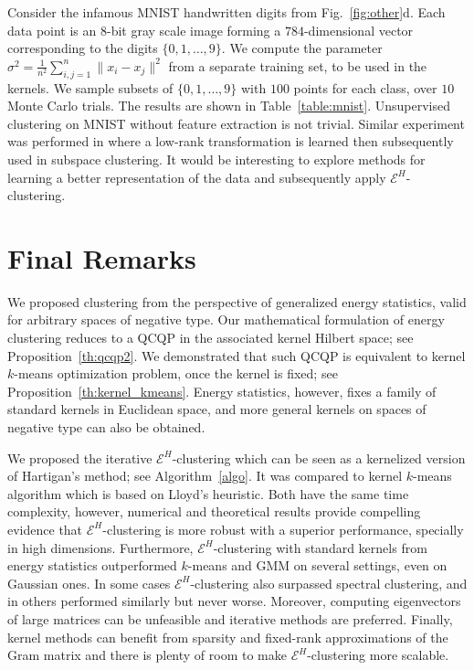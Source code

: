 \documentclass[twoside]{article}
\begin{document}
Consider 
the infamous MNIST handwritten digits
from Fig.~\ref{fig:other}d.
Each data point is an $8$-bit gray scale
image forming a $784$-dimensional vector 
corresponding to the digits $\{0,1,\dotsc,9 \}$.
We compute the parameter 
$
\sigma^2 = \tfrac{1}{n^2} \sum_{i,j=1}^n \| x_i - x_j \|^2 
$
from a separate
training set, to be used in the kernels.
We sample subsets of $\{0,1,\dotsc,9 \}$ with $100$ points 
for each class, over $10$ Monte Carlo trials.
The results are shown in Table~\ref{table:mnist}.
Unsupervised clustering on MNIST without feature extraction
is not trivial. Similar 
experiment was performed in \citep{Sapiro} where a low-rank
transformation is learned then subsequently used in subspace clustering. 
It would be interesting to explore methods
for learning a better representation of the data and subsequently apply
$\mathcal{E}^H$-clustering.


\section{Final Remarks}
\label{sec:conclusion}

We proposed clustering from the perspective of generalized energy
statistics, valid for arbitrary spaces of negative type.
Our mathematical formulation of energy clustering 
reduces to a QCQP in the associated kernel Hilbert space; 
see  Proposition~\ref{th:qcqp2}.
We demonstrated that such QCQP
is equivalent to kernel $k$-means optimization problem, 
once the kernel is fixed; see
Proposition~\ref{th:kernel_kmeans}. Energy statistics, however, fixes
a family of standard kernels in Euclidean space, and
more general kernels 
on spaces of negative type can also be obtained.

We proposed the iterative $\mathcal{E}^H$-clustering which can be seen
as a kernelized version of Hartigan's method; see Algorithm~\ref{algo}. 
It was compared to kernel $k$-means algorithm
which is based on Lloyd's heuristic.
Both have the same time complexity, however, numerical and theoretical
results provide compelling evidence that $\mathcal{E}^H$-clustering
is more robust with a superior performance, specially in high
dimensions. 
Furthermore, $\mathcal{E}^H$-clustering with standard kernels from energy
statistics outperformed $k$-means and GMM
on several settings, even on Gaussian ones.
In some cases
$\mathcal{E}^H$-clustering also surpassed spectral clustering, and in
others performed similarly but never worse. Moreover, computing eigenvectors
of large matrices can be unfeasible and iterative methods are preferred.
Finally, kernel methods can benefit from sparsity and
fixed-rank approximations of the Gram matrix and there is plenty
of room to make $\mathcal{E}^H$-clustering more scalable.
\end{document}
